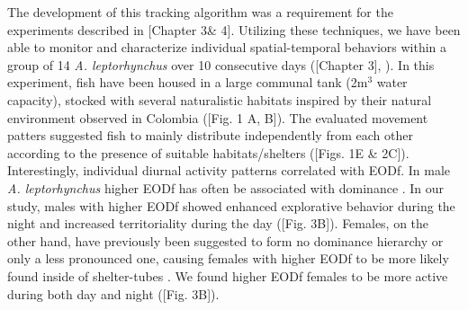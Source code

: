 \documentclass[11pt,pdftex]{article}
\newcommand{\note}[2][]{\textcolor{red!80!black}{[\textbf{\ifthenelse{\equal{#1}{}}{}{#1: }}#2]}}
\newcommand{\notetr}[1]{\note[TR]{#1}}
\newcommand{\lepto}{\textit{A. leptorhynchus}}
\begin{document}
The development of this tracking algorithm was a requirement for the experiments described in \notetr{Chapter 3\& 4}. Utilizing these techniques, we have been able to monitor and characterize individual spatial-temporal behaviors within a group of 14 \lepto{} over 10 consecutive days (\notetr{Chapter 3}, \citealp{Raab2019}). In this experiment, fish have been housed in a large communal tank (2m$^3$ water capacity), stocked with several naturalistic habitats inspired by their natural environment observed in Colombia (\notetr{Fig. 1 A, B}). The evaluated movement patters suggested fish to mainly distribute independently from each other according to the presence of suitable habitats/shelters (\notetr{Figs. 1E \& 2C}). Interestingly, individual diurnal activity patterns correlated with EODf. In male \lepto{} higher EODf has often be associated with dominance \citep{Hagedorn1985, Dunlap2002, Triefenbach2008}. In our study, males with higher EODf showed enhanced explorative behavior during the night and increased territoriality during the day (\notetr{Fig. 3B}). Females, on the other hand, have previously been suggested to form no dominance hierarchy \citep{Hagedorn1985} or only a less pronounced one, causing females with higher EODf to be more likely found inside of shelter-tubes \citep{Dunlap2002}. We found higher EODf females to be more active during both day and night (\notetr{Fig. 3B}).
\end{document}
